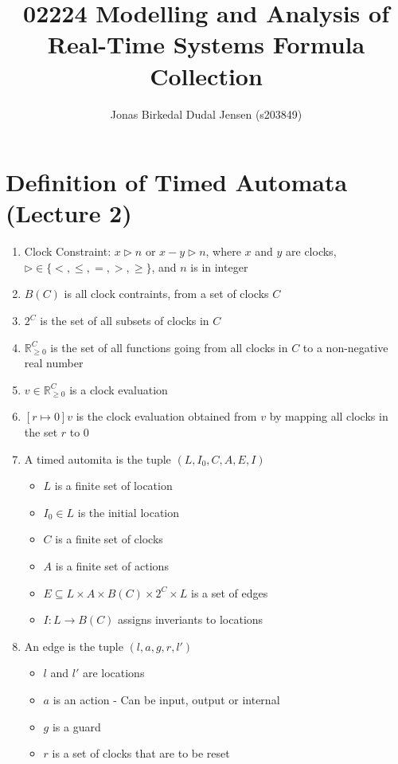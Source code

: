 \documentclass{article}
\title{02224 Modelling and Analysis of Real-Time Systems Formula Collection}
\date{}
\author{Jonas Birkedal Dudal Jensen (s203849)}
\begin{document}
	\maketitle

	\tableofcontents

	\newpage
	
	\section{Definition of Timed Automata (Lecture 2)}
		\begin{enumerate}
			\item Clock Constraint: $x\triangleright n$ or $x-y\triangleright n$, where $x$ and $y$ are clocks, $\triangleright\in\{<,\leq,=,>,\geq\}$, and $n$ is in integer
			\item $B(C)$ is all clock contraints, from a set of clocks $C$
			\item $2^C$ is the set of all subsets of clocks in $C$
			\item $\mathbb{R}^C_{\geq0}$ is the set of all functions going from all clocks in $C$ to a non-negative real number
			\item $v\in\mathbb{R}^C_{\geq0}$ is a clock evaluation
			\item $[r\mapsto0]v$ is the clock evaluation obtained from $v$ by mapping all clocks in the set $r$ to $0$
			\item A timed automita is the tuple $(L, I_0, C, A, E, I)$
				\begin{itemize}
					\item $L$ is a finite set of location
					\item $I_0\in L$ is the initial location
					\item $C$ is a finite set of clocks
					\item $A$ is a finite set of actions
					\item $E\subseteq L\times A\times B(C)\times 2^C\times L$ is a set of edges
					\item $I:L\rightarrow B(C)$ assigns inveriants to locations
				\end{itemize}
			\item An edge is the tuple $(l, a, g, r, l')$
				\begin{itemize}
					\item $l$ and $l'$ are locations
					\item $a$ is an action - Can be input, output or internal
					\item $g$ is a guard
					\item $r$ is a set of clocks that are to be reset

\end{itemize}
\end{enumerate}
\end{document}
